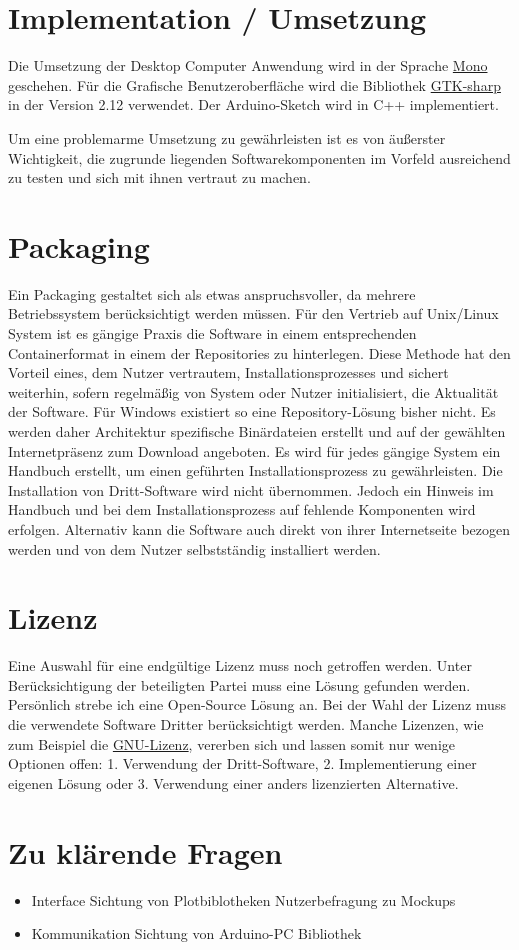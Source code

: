 \section{Implementation / Umsetzung}
Die Umsetzung der Desktop Computer Anwendung wird in der Sprache \href{http://www.mono-project.com/}{Mono} geschehen. Für die Grafische Benutzeroberfläche wird die Bibliothek \href{http://www.gtk.org/}{GTK-sharp} in der Version 2.12 verwendet. Der Arduino-Sketch wird in C++ implementiert.

Um eine problemarme Umsetzung zu gewährleisten ist es von äußerster Wichtigkeit, die zugrunde liegenden Softwarekomponenten im Vorfeld ausreichend zu testen und sich mit ihnen vertraut zu machen. 
\section{Packaging}
Ein Packaging gestaltet sich als etwas anspruchsvoller, da mehrere Betriebssystem berücksichtigt werden müssen. Für den Vertrieb auf Unix/Linux System ist es gängige Praxis die Software in einem entsprechenden Containerformat in einem der Repositories zu hinterlegen. Diese Methode hat den Vorteil eines, dem Nutzer vertrautem, Installationsprozesses und sichert weiterhin, sofern regelmäßig von System oder Nutzer initialisiert, die Aktualität der Software. 
Für Windows existiert so eine Repository-Lösung bisher nicht. Es werden daher Architektur spezifische Binärdateien erstellt und auf der gewählten Internetpräsenz zum Download angeboten. 
Es wird für jedes gängige System ein Handbuch erstellt, um einen geführten Installationsprozess zu gewährleisten.
Die Installation von Dritt-Software wird nicht übernommen. Jedoch ein Hinweis im Handbuch und bei dem Installationsprozess auf fehlende Komponenten wird erfolgen.
Alternativ kann die Software auch direkt von ihrer Internetseite bezogen werden und von dem Nutzer selbstständig installiert werden.
\section{Lizenz}
Eine Auswahl für eine endgültige Lizenz muss noch getroffen werden. Unter Berücksichtigung der beteiligten Partei muss eine Lösung gefunden werden. Persönlich strebe ich eine Open-Source Lösung an.
Bei der Wahl der Lizenz muss die verwendete Software Dritter berücksichtigt werden. Manche Lizenzen, wie zum Beispiel die \href{https://www.gnu.org/licenses/licenses.html#GPL}{GNU-Lizenz}, vererben sich und lassen somit nur wenige Optionen offen: 1. Verwendung der Dritt-Software, 2. Implementierung einer eigenen Lösung oder 3. Verwendung einer anders lizenzierten Alternative.
\section{Zu klärende Fragen}
\begin{itemize}
 \item Interface
  \subitem Sichtung von Plotbiblotheken
  \subitem Nutzerbefragung zu Mockups
 \item Kommunikation
  \subitem Sichtung von Arduino-PC Bibliothek  
\end{itemize}


